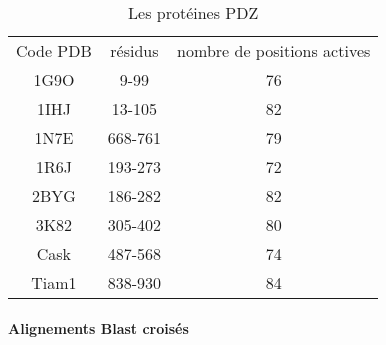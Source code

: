 \label{sec:ensemble_PDZ}

    \begin{table}[!htbp]
      \centering

      \begin{tabular}{ccc}

        \toprule
        Code PDB & résidus & nombre de positions actives\\
        \cmidrule{1-3}
        1G9O  & 	9-99	 & 	76	 \\
        1IHJ  & 	13-105	 & 	82	 \\
        1N7E  & 	668-761	 & 	79	 \\
        1R6J  & 	193-273	 & 	72	 \\
        2BYG  & 	186-282	 & 	82	 \\
        3K82  & 	305-402	 & 	80	 \\
        Cask  & 	487-568	 & 	74	 \\
        Tiam1 & 	838-930	 & 	84	 \\
        \bottomrule

      \end{tabular}      
      \caption{Les protéines PDZ}
\label{tab:protéines_PDZ}      
    \end{table}

\paragraph{Alignements Blast croisés}


